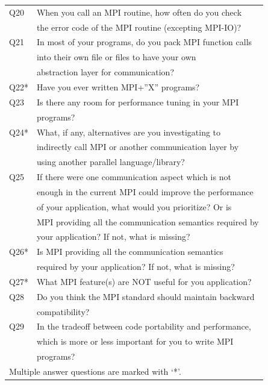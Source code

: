 \documentclass[conference,10pt,letterpaper]{IEEEtran}
\def\myquote#1{`#1'}
\begin{document}
\begin{table}
\begin{center}
\begin{tabular}{l|l}
  \hline
  Q20  & When you call an MPI routine, how often do you check \\
  & the error code of the MPI routine  (excepting MPI-IO)? \\
  \hline
  Q21  & In most of your programs, do you pack MPI function calls \\
  & into their own file or files to have your own \\
  & abstraction layer for communication? \\
  \hline
  Q22* & Have you ever written MPI+''X'' programs? \\
  \hline
  Q23  & Is there any room for performance tuning in your MPI \\
  & programs? \\
  \hline
  Q24* & What, if any, alternatives are you investigating to \\
  & indirectly call MPI or another communication layer by \\
  & using another parallel language/library? \\
  \hline
  Q25  & If there were one communication aspect which is not \\
  & enough in the current MPI could improve the performance \\
  & of your application, what would you prioritize?  Or is \\
  & MPI providing all the communication semantics required by \\
  & your application?  If not, what is missing? \\
  \hline
  Q26* & Is MPI providing all the communication semantics \\
  & required by your application? If not, what is missing? \\
  \hline
  Q27* & What MPI feature(s) are NOT useful for you application? \\
  \hline
  Q28  & Do you think the MPI standard should maintain backward \\
  & compatibility? \\
  \hline
  Q29  & In the tradeoff between code portability and performance, \\
  & which is more or less important for you to write MPI \\
  & programs? \\
  \hline
  \multicolumn{2}{l}{Multiple answer questions are marked with \myquote{*}.} \\
\end{tabular}
\end{center}
\end{table}
\end{document}
